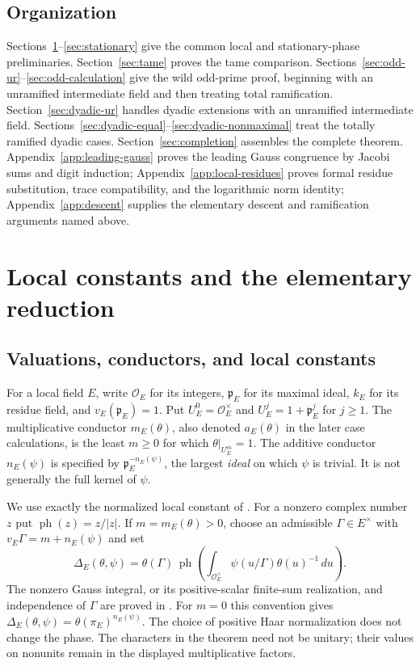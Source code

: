 \documentclass[11pt]{amsart}
\theoremstyle{definition}
\theoremstyle{remark}
\newcommand{\ph}{\operatorname{ph}}
\newcommand{\OO}{\mathcal O}\newcommand{\pp}{\mathfrak p}\newcommand{\PP}{\mathfrak P}
\begin{document}
\subsection*{Organization}
Sections~\ref{sec:local-notation}--\ref{sec:stationary} give the common
local and stationary-phase preliminaries.
Section~\ref{sec:tame} proves the tame comparison.
Sections~\ref{sec:odd-ur}--\ref{sec:odd-calculation} give the wild
odd-prime proof, beginning with an unramified intermediate field and
then treating total ramification. Section~\ref{sec:dyadic-ur} handles
dyadic extensions with an unramified intermediate field.
Sections~\ref{sec:dyadic-equal}--\ref{sec:dyadic-nonmaximal} treat
the totally ramified dyadic cases. Section~\ref{sec:completion}
assembles the complete theorem. Appendix~\ref{app:leading-gauss} proves
the leading Gauss congruence by Jacobi sums and digit induction;
Appendix~\ref{app:local-residues} proves formal residue substitution,
trace compatibility, and the logarithmic norm identity;
Appendix~\ref{app:descent} supplies the elementary descent and
ramification arguments named above.


\section{Local constants and the elementary reduction}\label{sec:local-notation}\label{U:statement}
\subsection{Valuations, conductors, and local constants}
For a local field $E$, write $\OO_E$ for its integers, $\pp_E$ for its
maximal ideal, $k_E$ for its residue field, and $v_E(\pp_E)=1$.
Put $U_E^0=\OO_E^\times$ and $U_E^j=1+\pp_E^j$ for $j\ge1$.
The multiplicative conductor $m_E(\theta)$, also denoted $a_E(\theta)$
in the later case calculations, is the least $m\ge0$ for which
$\theta|_{U_E^m}=1$. The additive conductor $n_E(\psi)$ is specified by
$\pp_E^{-n_E(\psi)}$, the largest \emph{ideal} on which $\psi$ is trivial.
It is not generally the full kernel of $\psi$.

We use exactly the normalized local constant of \cite{Ueda}.
For a nonzero complex number $z$ put $\ph(z)=z/|z|$.
If $m=m_E(\theta)>0$, choose an admissible $\Gamma\in E^\times$ with
$v_E\Gamma=m+n_E(\psi)$ and set
\begin{equation}\label{U:delta-definition}
 \Delta_E(\theta,\psi)=\theta(\Gamma)\,
 \ph\!\left(\int_{\OO_E^\times}\psi(u/\Gamma)\theta(u)^{-1}\,du\right).
\end{equation}
The nonzero Gauss integral, or its positive-scalar finite-sum realization,
and independence of $\Gamma$ are proved in \cite{Ueda}.
For $m=0$ this convention gives
$\Delta_E(\theta,\psi)=\theta(\pi_E)^{n_E(\psi)}$.
The choice of positive Haar normalization does not change the phase.
The characters in the theorem need not be unitary; their values on
nonunits remain in the displayed multiplicative factors.
\end{document}
